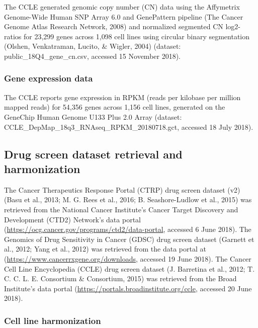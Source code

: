 \documentclass[man,floatsintext]{apa6}
\begin{document}
The CCLE generated genomic copy number (CN) data using the Affymetrix
Genome-Wide Human SNP Array 6.0 and GenePattern pipeline (The Cancer
Genome Atlas Research Network, 2008) and normalized segmented CN
log2-ratios for 23,299 genes across 1,098 cell lines using circular
binary segmentation (Olshen, Venkatraman, Lucito, \& Wigler, 2004)
(dataset: public\_18Q4\_gene\_cn.csv, accessed 15 November 2018).

\subsubsection{Gene expression data}\label{gene-expression-data}

The CCLE reports gene expression in RPKM (reads per kilobase per million
mapped reads) for 54,356 genes across 1,156 cell lines, generated on the
GeneChip Human Genome U133 Plus 2.0 Array (dataset:
CCLE\_DepMap\_18q3\_RNAseq\_RPKM\_20180718.gct, accessed 18 July 2018).

\subsection{Drug screen dataset retrieval and
harmonization}\label{drug-screen-dataset-retrieval-and-harmonization}

The Cancer Therapeutics Response Portal (CTRP) drug screen dataset (v2)
(Basu et al., 2013; M. G. Rees et al., 2016; B. Seashore-Ludlow et al.,
2015) was retrieved from the National Cancer Institute's Cancer Target
Discovery and Development (CTD2) Network's data portal
(\url{https://ocg.cancer.gov/programs/ctd2/data-portal}, accessed 6 June
2018). The Genomics of Drug Sensitivity in Cancer (GDSC) drug screen
dataset (Garnett et al., 2012; Yang et al., 2012) was retrieved from the
data portal at (\url{https://www.cancerrxgene.org/downloads}, accessed
19 June 2018). The Cancer Cell Line Encyclopedia (CCLE) drug screen
dataset (J. Barretina et al., 2012; T. C. C. L. E. Consortium \&
Consortium, 2015) was retrieved from the Broad Institute's data portal
(\url{https://portals.broadinstitute.org/ccle}, accessed 20 June 2018).

\subsubsection{Cell line harmonization}\label{cell-line-harmonization}
\end{document}
